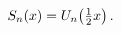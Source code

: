 $\mathop{S_{n}\/}\nolimits\!\left(x\right)=\mathop{U_{n}\/}\nolimits\!\left(%
\tfrac{1}{2}x\right).$